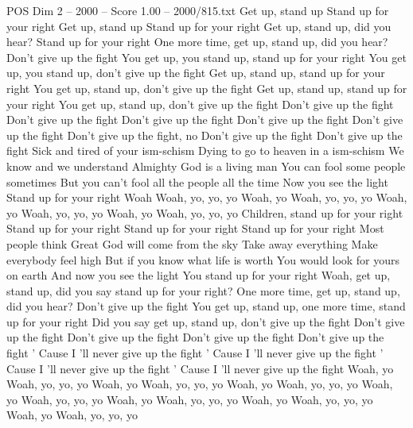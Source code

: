 \begin{textsample}{POS Dim 2 – 2000 – Score 1.00 – 2000/815.txt}  \label{ex:f2_pos_017}
Get up, stand up Stand up for your right Get up, stand up Stand up for your right Get up, stand up, did you hear?
Stand up for your right One more time, get up, stand up, did you hear?
Don't give up the fight You get up, you stand up, stand up for your right You get up, you stand up, don't give up the fight Get up, stand up, stand up for your right You get up, stand up, don't give up the fight Get up, stand up, stand up for your right You get up, stand up, don't give up the fight Don't give up the fight Don't give up the fight Don't give up the fight Don't give up the fight Don't give up the fight Don't give up the fight, no Don't give up the fight Don't give up the fight Sick and tired of your ism-schism Dying to go to heaven in a ism-schism We know and we understand Almighty God is a living man You can fool some people sometimes But you can't fool all the people all the time Now you see the light Stand up for your right Woah Woah, yo, yo, yo Woah, yo Woah, yo, yo, yo Woah, yo Woah, yo, yo, yo Woah, yo Woah, yo, yo, yo Children, stand up for your right Stand up for your right Stand up for your right Stand up for your right Most people think Great God will come from the sky Take away everything Make everybody feel high But if you know what life is worth You would look for yours on earth And now you see the light You stand up for your right Woah, get up, stand up, did you say stand up for your right?
One more time, get up, stand up, did you hear?
Don't give up the fight You get up, stand up, one more time, stand up for your right Did you say get up, stand up, don't give up the fight Don't give up the fight Don't give up the fight Don't give up the fight Don't give up the fight ' Cause I 'll never give up the fight ' Cause I 'll never give up the fight ' Cause I 'll never give up the fight ' Cause I 'll never give up the fight Woah, yo Woah, yo, yo, yo Woah, yo Woah, yo, yo, yo Woah, yo Woah, yo, yo, yo Woah, yo Woah, yo, yo, yo Woah, yo Woah, yo, yo, yo Woah, yo Woah, yo, yo, yo Woah, yo Woah, yo, yo, yo

\end{textsample}

